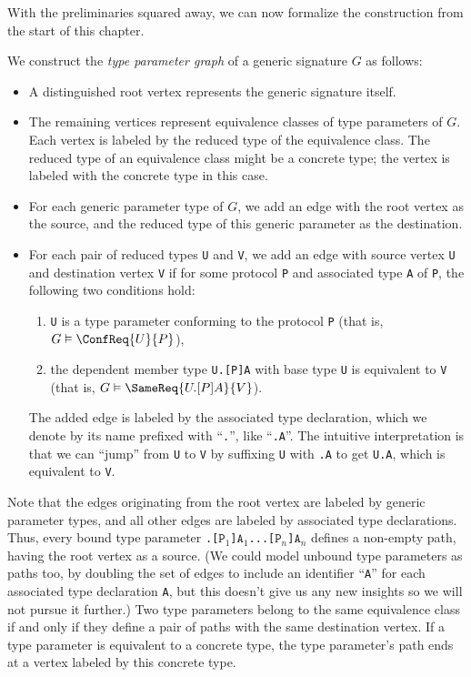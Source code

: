 \documentclass[../generics]{subfiles}
\begin{document}
\smallskip
With the preliminaries squared away, we can now formalize the construction from the start of this chapter. 
\begin{definition}
We construct the \emph{type parameter graph} of a generic signature $G$ as follows:
\begin{itemize}
\item A distinguished root vertex represents the generic signature itself.
\item The remaining vertices represent equivalence classes of type parameters of $G$. Each vertex is labeled by the reduced type of the equivalence class. The reduced type of an equivalence class might be a concrete type; the vertex is labeled with the concrete type in this case.
\item For each generic parameter type of $G$, we add an edge with the root vertex as the source, and the reduced type of this generic parameter as the destination.
\item For each pair of reduced types \texttt{U} and \texttt{V}, we add an edge with source vertex \texttt{U} and destination vertex \texttt{V} if for some protocol \texttt{P} and associated type \texttt{A} of \texttt{P}, the following two conditions hold:
\begin{enumerate}
\item \texttt{U} is a type parameter conforming to the protocol \texttt{P} (that is, $G\vDash\ConfReq{U}{P}$),
\item the dependent member type \texttt{U.[P]A} with base type \texttt{U} is equivalent to \texttt{V} (that is, $G\vDash\SameReq{U.[P]A}{V}$).
\end{enumerate}
The added edge is labeled by the associated type declaration, which we denote by its name prefixed with ``\texttt{.}'', like ``\texttt{.A}''. The intuitive interpretation is that we can ``jump'' from \texttt{U} to \texttt{V} by suffixing \texttt{U} with \texttt{.A} to get \texttt{U.A}, which is equivalent to \texttt{V}.
\end{itemize}
\end{definition}

Note that the edges originating from the root vertex are labeled by generic parameter types, and all other edges are labeled by associated type declarations. Thus, every bound type parameter \texttt{.[$\texttt{P}_1$]$\texttt{A}_1$...[$\texttt{P}_n$]$\texttt{A}_n$} defines a non-empty path, having the root vertex as a source. (We could model unbound type parameters as paths too, by doubling the set of edges to include an identifier ``\texttt{A}'' for each associated type declaration \texttt{A}, but this doesn't give us any new insights so we will not pursue it further.) Two type parameters belong to the same equivalence class if and only if they define a pair of paths with the same destination vertex. If a type parameter is equivalent to a concrete type, the type parameter's path ends at a vertex labeled by this concrete type.
\end{document}
